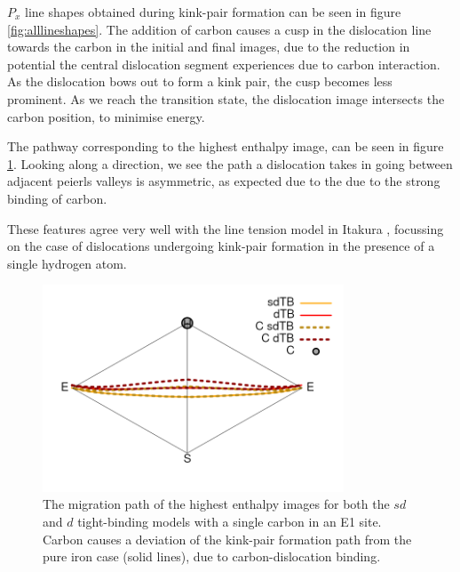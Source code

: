 \documentclass[a4paper,12pt,oneside,print,numbered,index,PageStyleIII]{PhDThesisPSnPDF}
\begin{document}
\begin{enumerate}
\(P_x\) line shapes obtained during kink-pair formation can be seen in figure
\ref{fig:alllineshapes}. The addition of carbon causes a cusp in the
dislocation line towards the carbon in the initial and final images, due to
the reduction in potential the central dislocation segment experiences due
to carbon interaction. As the dislocation bows out to form a kink pair, the
cusp becomes less prominent. As we reach the transition state, the dislocation
image intersects the carbon position, to minimise energy.

The pathway corresponding to the highest enthalpy image, can be seen in
figure \ref{fig:pathwaysinglec}. Looking along a direction, we see the path a
dislocation takes in going between adjacent peierls valleys is asymmetric,
as expected due to the due to the strong binding of carbon.

These features agree very well with the line tension model in Itakura
\cite{itakura13_effec_hydrog_atoms_screw_disloc}, focussing on the case of
dislocations undergoing kink-pair formation in the presence of a single
hydrogen atom.

\begin{figure}[htbp]
\centering
\includegraphics[width=0.8\textwidth]{iron/Images/pathway_single_carbon_sd_d.png}
\caption{The migration path of the highest enthalpy images for both the \(sd\) and \(d\) tight-binding models with a single carbon in an E1 site. Carbon causes a deviation of the kink-pair formation path from the pure iron case (solid lines), due to carbon-dislocation binding. \label{fig:pathwaysinglec}}
\end{figure}



\end{enumerate}
\end{document}
